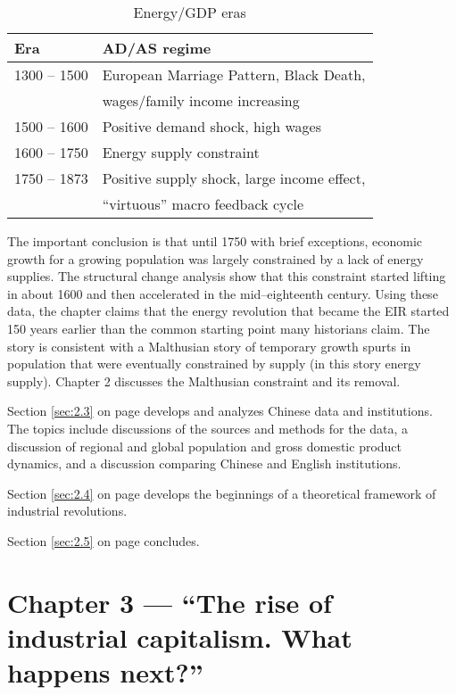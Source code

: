 \linespread{1.0}
\begin{table}[h!]

\center
\begin{tabular}{ll}
Era&AD/AS regime\\
\hline \hline
1300 -- 1500&European Marriage Pattern, Black Death, \\&wages/family income increasing\\
1500 -- 1600&Positive demand shock, high wages\\
1600 -- 1750&Energy supply constraint\\
1750 -- 1873&Positive supply shock, large income effect,\\&``virtuous'' macro feedback cycle\\
\hline
\end{tabular}
\caption{Energy/GDP eras}
\label{tbl:EnergyGdp}
\end{table}
\linespread{1.9}

\vspace*{-10.5pt}

The important conclusion is that until 1750 with brief exceptions, economic growth for a growing population was largely constrained by a lack of energy supplies. The structural change analysis show that this constraint started lifting in about 1600 and then accelerated in the mid--eighteenth century. Using these data, the chapter claims that the energy revolution that became the EIR started 150 years earlier than the common starting point many historians claim. The story is consistent with a Malthusian story of temporary growth spurts in population that were eventually constrained by supply (in this story energy supply). Chapter 2 discusses the Malthusian constraint and its removal.
	
	Section \ref{sec:2.3} on page \pageref{sec:2.3} develops and analyzes Chinese data and institutions. The topics include discussions of the sources and methods for the data, a discussion of regional and global population and gross domestic product dynamics, and a discussion comparing Chinese and English institutions.
	
	Section \ref{sec:2.4} on page \pageref{sec:2.4} develops the beginnings of a theoretical framework of industrial revolutions.
	
	Section \ref{sec:2.5} on page \pageref{sec:2.5} concludes.

\linespread{1.0}	
\section{Chapter 3 --- ``The rise of industrial capitalism. What happens next?''}
\linespread{1.6}
\vspace{.21in}


